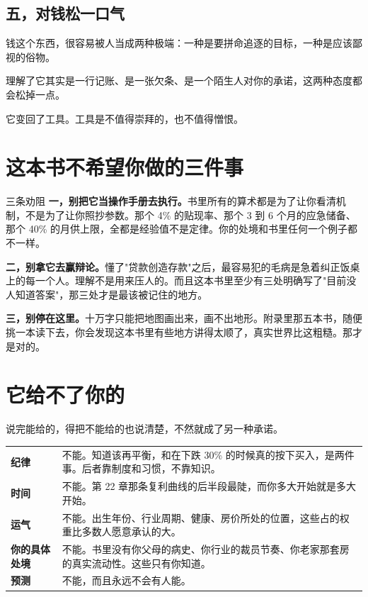 \subsection{五，对钱松一口气}

钱这个东西，很容易被人当成两种极端：一种是要拼命追逐的目标，一种是应该鄙视的俗物。

理解了它其实是一行记账、是一张欠条、是一个陌生人对你的承诺，这两种态度都会松掉一点。

它变回了工具。工具是不值得崇拜的，也不值得憎恨。

\bookbreak

\section{这本书不希望你做的三件事}

\begin{warnbox}{三条劝阻}
\textbf{一，别把它当操作手册去执行。}书里所有的算术都是为了让你看清机制，不是为了让你照抄参数。那个 4\% 的贴现率、那个 3 到 6 个月的应急储备、那个 40\% 的月供上限，全都是经验值不是定律。你的处境和书里任何一个例子都不一样。

\textbf{二，别拿它去赢辩论。}懂了"贷款创造存款"之后，最容易犯的毛病是急着纠正饭桌上的每一个人。理解不是用来压人的。而且这本书里至少有三处明确写了"目前没人知道答案"，那三处才是最该被记住的地方。

\textbf{三，别停在这里。}十万字只能把地图画出来，画不出地形。附录里那五本书，随便挑一本读下去，你会发现这本书里有些地方讲得太顺了，真实世界比这粗糙。那才是对的。

\end{warnbox}

\section{它给不了你的}

说完能给的，得把不能给的也说清楚，不然就成了另一种承诺。

\begin{tablewrap}
\begin{xltabular}{\linewidth}{XX}
\toprule
{} &  \\
\midrule
\textbf{纪律} & 不能。知道该再平衡，和在下跌 30\% 的时候真的按下买入，是两件事。后者靠制度和习惯，不靠知识。 \\
\textbf{时间} & 不能。第 22 章那条复利曲线的后半段最陡，而你多大开始就是多大开始。 \\
\textbf{运气} & 不能。出生年份、行业周期、健康、房价所处的位置，这些占的权重比多数人愿意承认的大。 \\
\textbf{你的具体处境} & 不能。书里没有你父母的病史、你行业的裁员节奏、你老家那套房的真实流动性。这些只有你知道。 \\
\textbf{预测} & 不能，而且永远不会有人能。 \\
\bottomrule
\end{xltabular}
\end{tablewrap}

